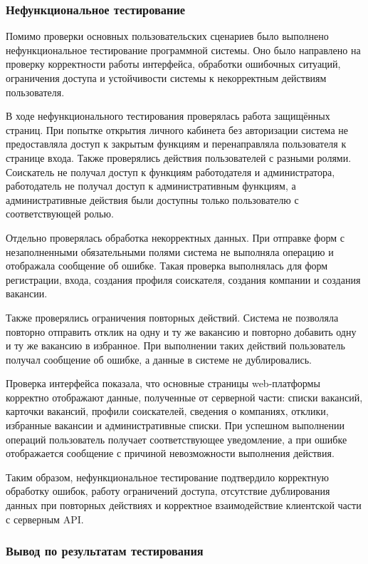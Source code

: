 \subsubsection{Нефункциональное тестирование}

Помимо проверки основных пользовательских сценариев было выполнено нефункциональное тестирование программной системы. Оно было направлено на проверку корректности работы интерфейса, обработки ошибочных ситуаций, ограничения доступа и устойчивости системы к некорректным действиям пользователя.

В ходе нефункционального тестирования проверялась работа защищённых страниц. При попытке открытия личного кабинета без авторизации система не предоставляла доступ к закрытым функциям и перенаправляла пользователя к странице входа. Также проверялись действия пользователей с разными ролями. Соискатель не получал доступ к функциям работодателя и администратора, работодатель не получал доступ к административным функциям, а административные действия были доступны только пользователю с соответствующей ролью.

Отдельно проверялась обработка некорректных данных. При отправке форм с незаполненными обязательными полями система не выполняла операцию и отображала сообщение об ошибке. Такая проверка выполнялась для форм регистрации, входа, создания профиля соискателя, создания компании и создания вакансии.

Также проверялись ограничения повторных действий. Система не позволяла повторно отправить отклик на одну и ту же вакансию и повторно добавить одну и ту же вакансию в избранное. При выполнении таких действий пользователь получал сообщение об ошибке, а данные в системе не дублировались.

Проверка интерфейса показала, что основные страницы web-платформы корректно отображают данные, полученные от серверной части: списки вакансий, карточки вакансий, профили соискателей, сведения о компаниях, отклики, избранные вакансии и административные списки. При успешном выполнении операций пользователь получает соответствующее уведомление, а при ошибке отображается сообщение с причиной невозможности выполнения действия.

Таким образом, нефункциональное тестирование подтвердило корректную обработку ошибок, работу ограничений доступа, отсутствие дублирования данных при повторных действиях и корректное взаимодействие клиентской части с серверным API.

\subsubsection{Вывод по результатам тестирования}

